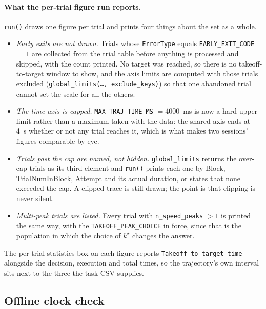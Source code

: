 \documentclass[11pt,a4paper]{article}
\newcommand{\code}[1]{\texttt{\small #1}}
\begin{document}
\paragraph{What the per-trial figure run reports.} \code{run()} draws one figure
per trial and prints four things about the set as a whole.

\begin{itemize}[leftmargin=*,itemsep=2pt]
\item \emph{Early exits are not drawn.} Trials whose \code{ErrorType} equals
\code{EARLY\_EXIT\_CODE} $= 1$ are collected from the trial table before
anything is processed and skipped, with the count printed. No target was
reached, so there is no takeoff-to-target window to show, and the axis limits
are computed with those trials excluded (\code{global\_limits(\ldots,
exclude\_keys)}) so that one abandoned trial cannot set the scale for all the
others.
\item \emph{The time axis is capped.} \code{MAX\_TRAJ\_TIME\_MS} $= 4000$~ms is
now a hard upper limit rather than a maximum taken with the data: the shared
axis ends at 4~s whether or not any trial reaches it, which is what makes two
sessions' figures comparable by eye.
\item \emph{Trials past the cap are named, not hidden.} \code{global\_limits}
returns the over-cap trials as its third element and \code{run()} prints each
one by Block, TrialNumInBlock, Attempt and its actual duration, or states that
none exceeded the cap. A clipped trace is still drawn; the point is that
clipping is never silent.
\item \emph{Multi-peak trials are listed.} Every trial with
\code{n\_speed\_peaks} $> 1$ is printed the same way, with the
\code{TAKEOFF\_PEAK\_CHOICE} in force, since that is the population in which
the choice of $k^\star$ changes the answer.
\end{itemize}

The per-trial statistics box on each figure reports \code{Takeoff-to-target
time} alongside the decision, execution and total times, so the trajectory's own
interval sits next to the three the task CSV supplies.

\subsection{Offline clock check}
\label{sec:offlineclock}
\end{document}
